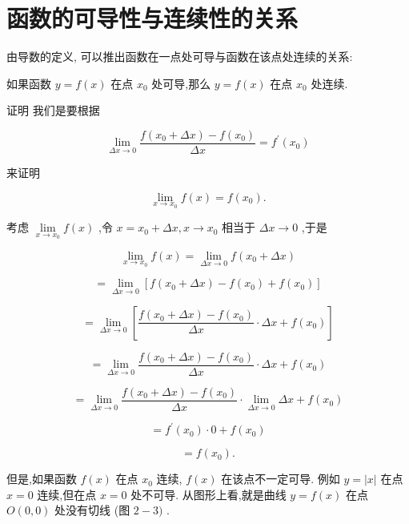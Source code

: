 \documentclass[lang=cn,newtx,10pt,scheme=chinese]{elegantbook}
\begin{document}
\section{函数的可导性与连续性的关系}

由导数的定义, 可以推出函数在一点处可导与函数在该点处连续的关系:

如果函数 \(y = f\left( x\right)\) 在点 \({x}_{0}\) 处可导,那么 \(y = f\left( x\right)\) 在点 \({x}_{0}\) 处连续.

证明 我们是要根据

\[
\mathop{\lim }\limits_{{{\Delta x} \rightarrow 0}}\frac{f\left( {{x}_{0} + {\Delta x}}\right) - f\left( {x}_{0}\right) }{\Delta x} = {f}^{\prime }\left( {x}_{0}\right)
\]

来证明

\[
\mathop{\lim }\limits_{{x \rightarrow {x}_{0}}}f\left( x\right) = f\left( {x}_{0}\right) .
\]

考虑 \(\mathop{\lim }\limits_{{x \rightarrow {x}_{0}}}f\left( x\right)\) ,令 \(x = {x}_{0} + {\Delta x},x \rightarrow {x}_{0}\) 相当于 \({\Delta x} \rightarrow 0\) ,于是

\[
\mathop{\lim }\limits_{{x \rightarrow {x}_{0}}}f\left( x\right) = \mathop{\lim }\limits_{{{\Delta x} \rightarrow 0}}f\left( {{x}_{0} + {\Delta x}}\right)
\]

\[
= \mathop{\lim }\limits_{{{\Delta x} \rightarrow 0}}\left\lbrack {f\left( {{x}_{0} + {\Delta x}}\right) - f\left( {x}_{0}\right) + f\left( {x}_{0}\right) }\right\rbrack
\]

\[
= \mathop{\lim }\limits_{{{\Delta x} \rightarrow 0}}\left\lbrack {\frac{f\left( {{x}_{0} + {\Delta x}}\right) - f\left( {x}_{0}\right) }{\Delta x} \cdot {\Delta x} + f\left( {x}_{0}\right) }\right\rbrack
\]

\[
= \mathop{\lim }\limits_{{{\Delta x} \rightarrow 0}}\frac{f\left( {{x}_{0} + {\Delta x}}\right) - f\left( {x}_{0}\right) }{\Delta x} \cdot {\Delta x} + f\left( {x}_{0}\right)
\]

\[
= \mathop{\lim }\limits_{{{\Delta x} \rightarrow 0}}\frac{f\left( {{x}_{0} + {\Delta x}}\right) - f\left( {x}_{0}\right) }{\Delta x} \cdot \mathop{\lim }\limits_{{{\Delta x} \rightarrow 0}}{\Delta x} + f\left( {x}_{0}\right)
\]

\[
= {f}^{\prime }\left( {x}_{0}\right) \cdot 0 + f\left( {x}_{0}\right)
\]

\[
= f\left( {x}_{0}\right) \text{.}
\]

但是,如果函数 \(f\left( x\right)\) 在点 \({x}_{0}\) 连续, \(f\left( x\right)\) 在该点不一定可导. 例如 \(y = \left| x\right|\) 在点 \(x = 0\) 连续,但在点 \(x = 0\) 处不可导. 从图形上看,就是曲线 \(y = f\left( x\right)\) 在点 \(O\left( {0,0}\right)\) 处没有切线 (图 \(2 - 3)\) .
\end{document}
